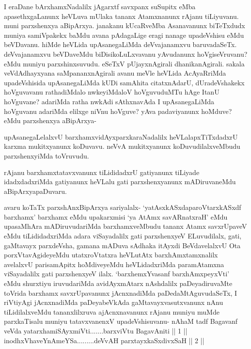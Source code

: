 
\begin{artha}
I eraDane bArxhamxNadalilx jAgarxtf savxpanx suSupitx eMba apasethxgaLanunx heVLuva mUlaka tananx Atamxnanunx rAjanu tiLiyuvanu. muni parxshenxya aBipArxya. janakanu kUcaRveMba Asanavanunx biTeTxdudx muniya samiVpakekx baMdu avana pAdagaLige eragi nanage upadeVshisu eMdu beVDavanu. hiMde heVLida upAsanegaLiMda deVvajanamxvu baruvadaSeTx. deVvajanamxvu beVDaveMdu biDisikoLuLxvavanu yAvudanunx hoVgiseVruvanu? eMdu muniyu parxshinxsuvudu. eSeTxV pUjayxnAgirali dhanikanAgirali. sakala veVdAdhayxyana saMpananxnAgirali avanu meVle heVLida AcAyaRriMda upadeVshisida upAsanegaLiMda kUDi samAhita citatxnAdarU, dUradeVshakekx hoVguvavanu rathadiMdalo nwkeyiMdaloV hoVguvuduMTu hAge ItanU hoVguvane? adariMda ratha nwkAdi sAthxnavAda I upAsanegaLiMda hoVguvanu adariMda elilxge niVnu hoVguve? yAva padaviyanunx hoMduve? eMdu parxshenxya aBipArxya-
\end{artha}%

\begin{artha}
upAsanegaLelalxvU barxhamxvidAyxparxkaraNadalilx heVLalapxTiTxdadxrU karxma mukitxyanunx koDuvavu. neVvA mukitxyanunx koDuvudilalxveMbudu parxshenxyiMda toVruvudu. 
\end{artha}


\begin{artha}
rAjanu barxhamxtatavxvanunx tiLididadxrU gatiyanunx tiLiyade idadxdadxriMda gatiyanunx heVLalu gati parxshenxyanunx mADiruvaneMdu aBipArxyapaDuvaru. 
\end{artha}

\begin{artha}
avaru koTaTx parxshAnxBipArxya sariyalalx- `yatAsxkASxdaparoVtarxkASxdf barxhamx' barxhamx eMdu upakarxmisi `ya AtAmx savARnatxraH' eMdu upasaMhAra mADiruvudariMda barxhamxveMbudu tananx Atamx savxrUpaveV eMdu tiLididadxriMda adara viSayadalilx gati parxshenxyeV ELuvudilalx, gati, gaMtavayx parxdeVsha, gamana mADuva sAdhaka itAyxdi BeVdavelalxvU Ota porxVtavAgideyeMdu utatxroVtatxra heVLutAtx barxhAmxtamxnalilx avelalxvU parisamApitx hoMdiveyeMdu heVLidadxriMda paramAtamxna viSayadalilx gati parxshenxyeV ilalx. `barxhemxYvasanf barxhAmxpeyxVti' eMdu shurxtiyu iruvudariMda avidAyxmAtarx nAshdalilx paDeyadiruvaMte toVrida barxhamx savxrUpavanunx jAcnxnadiMda paDedaMtAguvudaSeTx, I riVtiyAgi jAcnxnadiMda paDeyabeVkAda gaMtavayxvasutxvanunx nAnu tiLidilalxveMdu tananxlilxruva ajAcnxnavanunx rAjanu muniyu muMde parxkaTisalu muniyu tatavxvanenxV upadeVshisuvanu-
nAhaM tadf Bagavanf veVda yatarxhamiSAyxmiVti.......barxviVtu BagavAniti || 1 || \\
inodhxVhaveYnAmeYSa.........deVvAH parxtayxkaSxdivxSaH || 2 ||
\end{artha}

